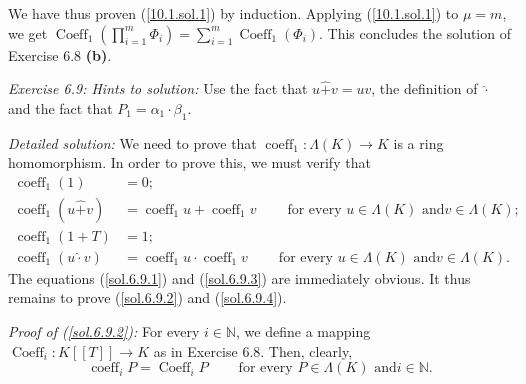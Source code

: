 \documentclass[numbers=enddot,12pt,final,onecolumn,notitlepage]{scrartcl}%
\begin{document}
We have thus proven (\ref{10.1.sol.1}) by induction. Applying
(\ref{10.1.sol.1}) to $\mu=m$, we get $\operatorname*{Coeff}\nolimits_{1}%
\left(  \prod\limits_{i=1}^{m}\Phi_{i}\right)  =\sum\limits_{i=1}%
^{m}\operatorname*{Coeff}\nolimits_{1}\left(  \Phi_{i}\right)  $. This
concludes the solution of Exercise 6.8 \textbf{(b)}.

\textit{Exercise 6.9: Hints to solution:} Use the fact that $u\widehat{+}%
v=uv$, the definition of $\widehat{\cdot}$ and the fact that $P_{1}=\alpha
_{1}\cdot\beta_{1}$.

\textit{Detailed solution:} We need to prove that $\operatorname*{coeff}%
\nolimits_{1}:\Lambda\left(  K\right)  \rightarrow K$ is a ring homomorphism.
In order to prove this, we must verify that%
\begin{align}
\operatorname*{coeff}\nolimits_{1}\left(  1\right)   &  =0;\label{sol.6.9.1}\\
\operatorname*{coeff}\nolimits_{1}\left(  u\widehat{+}v\right)   &
=\operatorname*{coeff}\nolimits_{1}u+\operatorname*{coeff}\nolimits_{1}%
v\ \ \ \ \ \ \ \ \ \ \text{for every }u\in\Lambda\left(  K\right)  \text{ and
}v\in\Lambda\left(  K\right)  ;\label{sol.6.9.2}\\
\operatorname*{coeff}\nolimits_{1}\left(  1+T\right)   &  =1;\label{sol.6.9.3}%
\\
\operatorname*{coeff}\nolimits_{1}\left(  u\widehat{\cdot}v\right)   &
=\operatorname*{coeff}\nolimits_{1}u\cdot\operatorname*{coeff}\nolimits_{1}%
v\ \ \ \ \ \ \ \ \ \ \text{for every }u\in\Lambda\left(  K\right)  \text{ and
}v\in\Lambda\left(  K\right)  . \label{sol.6.9.4}%
\end{align}
The equations (\ref{sol.6.9.1}) and (\ref{sol.6.9.3}) are immediately obvious.
It thus remains to prove (\ref{sol.6.9.2}) and (\ref{sol.6.9.4}).

\textit{Proof of (\ref{sol.6.9.2}):} For every $i\in\mathbb{N}$, we define a
mapping $\operatorname*{Coeff}\nolimits_{i}:K\left[  \left[  T\right]
\right]  \rightarrow K$ as in Exercise 6.8. Then, clearly,%
\begin{equation}
\operatorname*{coeff}\nolimits_{i}P=\operatorname*{Coeff}\nolimits_{i}%
P\ \ \ \ \ \ \ \ \ \ \text{for every }P\in\Lambda\left(  K\right)  \text{ and
}i\in\mathbb{N}. \label{sol.6.9.2.pf.1}%
\end{equation}
\end{document}
